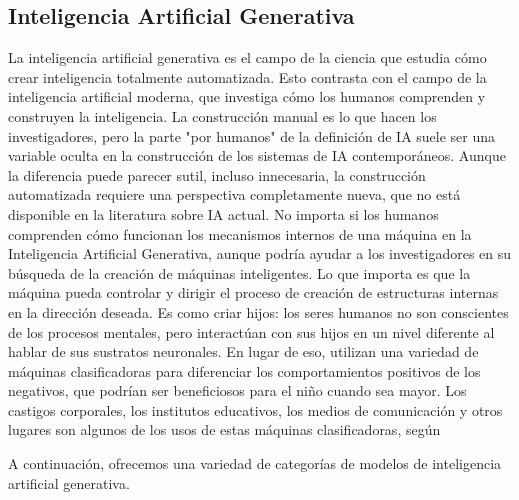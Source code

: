 \subsection{Inteligencia Artificial Generativa}

La inteligencia artificial generativa es el campo de la ciencia que estudia cómo crear inteligencia totalmente automatizada. Esto contrasta con el campo de la inteligencia artificial moderna, que investiga cómo los humanos comprenden y construyen la inteligencia. La construcción manual es lo que hacen los investigadores, pero la parte "por humanos" de la definición de IA suele ser una variable oculta en la construcción de los sistemas de IA contemporáneos. Aunque la diferencia puede parecer sutil, incluso innecesaria, la construcción automatizada requiere una perspectiva completamente nueva, que no está disponible en la literatura sobre IA actual. No importa si los humanos comprenden cómo funcionan los mecanismos internos de una máquina en la Inteligencia Artificial Generativa, aunque podría ayudar a los investigadores en su búsqueda de la creación de máquinas inteligentes. Lo que importa es que la máquina pueda controlar y dirigir el proceso de creación de estructuras internas en la dirección deseada. Es como criar hijos: los seres humanos no son conscientes de los procesos mentales, pero interactúan con sus hijos en un nivel diferente al hablar de sus sustratos neuronales. En lugar de eso, utilizan una variedad de máquinas clasificadoras para diferenciar los comportamientos positivos de los negativos, que podrían ser beneficiosos para el niño cuando sea mayor. Los castigos corporales, los institutos educativos, los medios de comunicación y otros lugares son algunos de los usos de estas máquinas clasificadoras, según \parencite{th_zant2010genai}

A continuación, ofrecemos una variedad de categorías de modelos de inteligencia artificial generativa.

